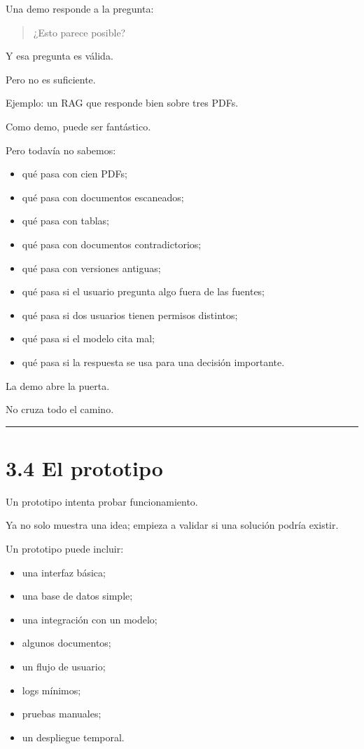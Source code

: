 Una demo responde a la pregunta:

\begin{quote}
¿Esto parece posible?
\end{quote}

Y esa pregunta es válida.

Pero no es suficiente.

Ejemplo: un RAG que responde bien sobre tres PDFs.

Como demo, puede ser fantástico.

Pero todavía no sabemos:

\begin{itemize}
\tightlist
\item
  qué pasa con cien PDFs;
\item
  qué pasa con documentos escaneados;
\item
  qué pasa con tablas;
\item
  qué pasa con documentos contradictorios;
\item
  qué pasa con versiones antiguas;
\item
  qué pasa si el usuario pregunta algo fuera de las fuentes;
\item
  qué pasa si dos usuarios tienen permisos distintos;
\item
  qué pasa si el modelo cita mal;
\item
  qué pasa si la respuesta se usa para una decisión importante.
\end{itemize}

La demo abre la puerta.

No cruza todo el camino.

\begin{center}\rule{0.5\linewidth}{0.5pt}\end{center}

\section{3.4 El prototipo}\label{el-prototipo}

Un prototipo intenta probar funcionamiento.

Ya no solo muestra una idea; empieza a validar si una solución podría
existir.

Un prototipo puede incluir:

\begin{itemize}
\tightlist
\item
  una interfaz básica;
\item
  una base de datos simple;
\item
  una integración con un modelo;
\item
  algunos documentos;
\item
  un flujo de usuario;
\item
  logs mínimos;
\item
  pruebas manuales;
\item
  un despliegue temporal.
\end{itemize}

